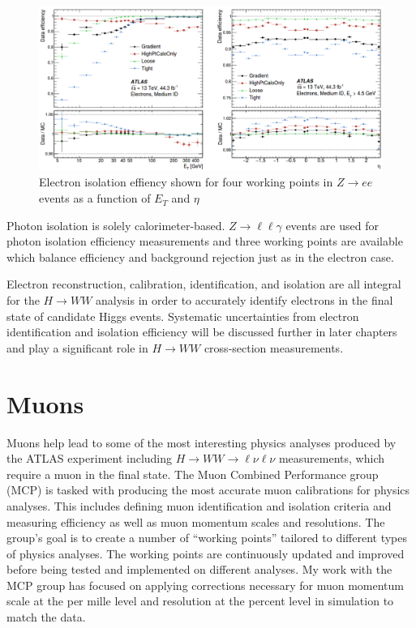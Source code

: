 \begin{figure}[!h]
        \centering
    \includegraphics[width=.65\textwidth]{Pictures/ElectronIsoEff.png}
    \caption{ Electron isolation effiency shown for four working points in $Z\rightarrow ee$ events as a function of $E_T$ and $\eta$ \cite{ElectronPhotonPerformance}}
    \label{fig:ElectronIsoEff}
\end{figure}

Photon isolation is solely calorimeter-based. $Z\rightarrow \ell\ell\gamma$ events are used for photon isolation efficiency measurements and three working points are available which balance efficiency and background rejection just as in the electron case. 

Electron reconstruction, calibration, identification, and isolation are all integral for the $H\rightarrow WW$ analysis in order to accurately identify electrons in the final state of candidate Higgs events. Systematic uncertainties from electron identification and isolation efficiency will be discussed further in later chapters and play a significant role in $H\rightarrow WW$ cross-section measurements. 

\section{Muons}
Muons help lead to some of the most interesting physics analyses produced by the ATLAS experiment including $H\rightarrow WW\rightarrow \ell\nu\ell\nu$ measurements, which require a muon in the final state. The Muon Combined Performance group (MCP) is tasked with producing the most accurate muon calibrations for physics analyses. This includes defining muon identification and isolation criteria and measuring efficiency as well as muon momentum scales and resolutions. The group's goal is to create a number of ``working points'' tailored to different types of physics analyses. The working points are continuously updated and improved before being tested and implemented on different analyses. My work with the MCP group has focused on applying corrections necessary for muon momentum scale at the per mille level and resolution at the percent level in simulation to match the data. 

